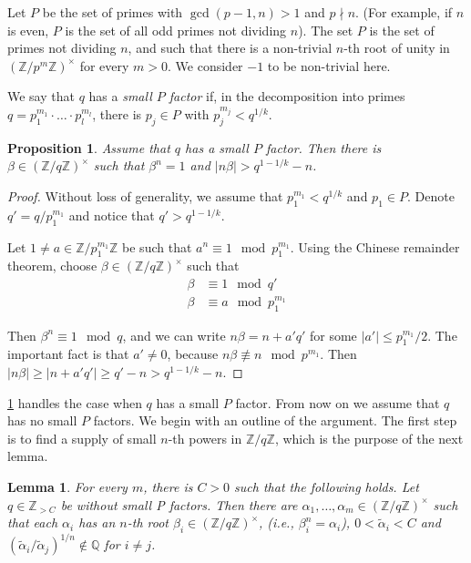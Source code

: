 \documentclass[12pt, a4paper]{amsart}
\numberwithin{equation}{section}
\newtheorem{lemma}[theorem]{Lemma}
\newtheorem{prop}[theorem]{Proposition}
\theoremstyle{definition}
\newcommand{\Q}{\mathbb{Q}}
\newcommand{\Z}{\mathbb{Z}}
\newcommand{\wt}{\widetilde}
\begin{document}
Let $P$ be the set of primes with $\gcd(p-1,n)>1$ and $p\nmid n$.
(For example, if $n$ is even, $P$ is the set of all odd primes not dividing $n$). 
The set $P$ is the set of primes not dividing $n$, and such that there is a non-trivial $n$-th root of unity in $(\Z/p^m\Z)^\times$ for every $m>0$. We consider $-1$ to be non-trivial here.

We say that $q$ has a \emph{small $P$ factor} if, in the decomposition into primes $q=p_{1}^{m_{1}}\cdot\ldots\cdot p_{l}^{m_{l}}$, there is $p_{j}\in P$ with $p_{j}^{m_{j}}<q^{1/k}$. 
\begin{prop}\label{prop:small P factor}
Assume that $q$ has a small $P$ factor. Then there is $\beta\in(\Z/q\Z)^{\times}$
such that $\beta^{n}=1$ and $\left|n\beta\right|>q^{1-1/k}-n$. 
\end{prop}

\begin{proof}
Without loss of generality, we assume that $p_{1}^{m_{1}}<q^{1/k}$ and
$p_{1}\in P$. Denote $q'=q/p_{1}^{m_{1}}$ and notice that $q'> q^{1-1/k}$. 

Let $1\ne a\in\Z/p_{1}^{m_{1}}\Z$ be such that $a^{n}\equiv1\mod p_{1}^{m_{1}}$.
Using the Chinese remainder theorem, choose $\beta\in\left(\Z/q\Z\right)^{\times}$
such that 
\begin{align*}
\beta & \equiv1\mod q'\\
\beta & \equiv a\mod p_{1}^{m_{1}}
\end{align*}

Then $\beta^{n}\equiv1\mod q$, and we can write $n\beta=n+a'q'$
for some $|a'|\le p_{1}^{m_{1}}/2$.
The important fact is that $a'\ne0$, because $n\beta\not\equiv n\mod p^{m_1}$.
Then $|n\beta|\ge\left|n+a'q'\right|\ge q'-n> q^{1-1/k}-n$.
\end{proof}

\cref{prop:small P factor} handles the case when $q$ has a small $P$ factor.
From now on we assume that $q$ has no small $P$ factors.
We begin with an outline of the argument.
The first step is to find a supply of small $n$-th powers in $\Z/q\Z$,
which is the purpose of the next lemma.

\begin{lemma}
\label{lem:Enough residues}For every $m$, there is $C>0$ such that the following holds.
Let $q\in \Z_{>C}$ be without small P factors.
Then there
are $\alpha_{1},\ldots,\alpha_{m}\in(\Z/q\Z)^{\times}$ such that each
$\alpha_{i}$ has an $n$-th root $\beta_{i}\in(\Z/q\Z)^\times$, (i.e., $\beta_{i}^{n}=\alpha_{i}$),
$0<\wt\alpha_{i}<C$ and  $(\wt\alpha_{i}/\wt\alpha_{j})^{1/n}\notin\Q$ for $i\ne j$.
\end{lemma}
\end{document}
